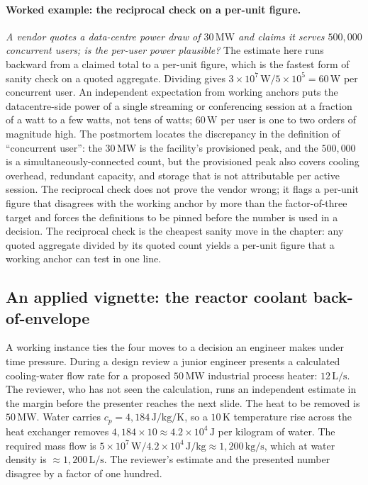 \paragraph{Worked example: the reciprocal check on a per-unit figure.}
\emph{A vendor quotes a data-centre power draw of $30 \,\si{\mega\watt}$
and claims it serves $500{,}000$ concurrent users; is the per-user
power plausible?} The estimate here runs backward from a claimed total
to a per-unit figure, which is the fastest form of sanity check on a
quoted aggregate. Dividing gives $3 \times 10^{7} \,\si{\watt} / 5
\times 10^{5} = 60 \,\si{\watt}$ per concurrent user. An independent
expectation from working anchors puts the datacentre-side power of a
single streaming or conferencing session at a fraction of a watt to a
few watts, not tens of watts; $60 \,\si{\watt}$ per user is one to two
orders of magnitude high. The postmortem locates the discrepancy in
the definition of ``concurrent user'': the $30 \,\si{\mega\watt}$ is
the facility's provisioned peak, and the $500{,}000$ is a
simultaneously-connected count, but the provisioned peak also covers
cooling overhead, redundant capacity, and storage that is not
attributable per active session. The reciprocal check does not prove
the vendor wrong; it flags a per-unit figure that disagrees with the
working anchor by more than the factor-of-three target and forces the
definitions to be pinned before the number is used in a decision. The
reciprocal check is the cheapest sanity move in the chapter: any quoted
aggregate divided by its quoted count yields a per-unit figure that a
working anchor can test in one line.

\subsection{An applied vignette: the reactor coolant back-of-envelope}

A working instance ties the four moves to a decision an engineer makes
under time pressure. During a design review a junior engineer presents
a calculated cooling-water flow rate for a proposed $50 \,\si{\mega
\watt}$ industrial process heater: $12 \,\si{\liter\per\second}$. The
reviewer, who has not seen the calculation, runs an independent
estimate in the margin before the presenter reaches the next slide.
The heat to be removed is $50 \,\si{\mega\watt}$. Water carries
$c_{p} = 4{,}184 \,\si{\joule\per\kilogram\per\kelvin}$, so a $10 \,
\si{\kelvin}$ temperature rise across the heat exchanger removes
$4{,}184 \times 10 \approx 4.2 \times 10^{4} \,\si{\joule}$ per
kilogram of water. The required mass flow is $5 \times 10^{7} \,\si
{\watt} / 4.2 \times 10^{4} \,\si{\joule\per\kilogram} \approx
1{,}200 \,\si{\kilogram\per\second}$, which at water density is
$\approx 1{,}200 \,\si{\liter\per\second}$. The reviewer's estimate
and the presented number disagree by a factor of one hundred.

